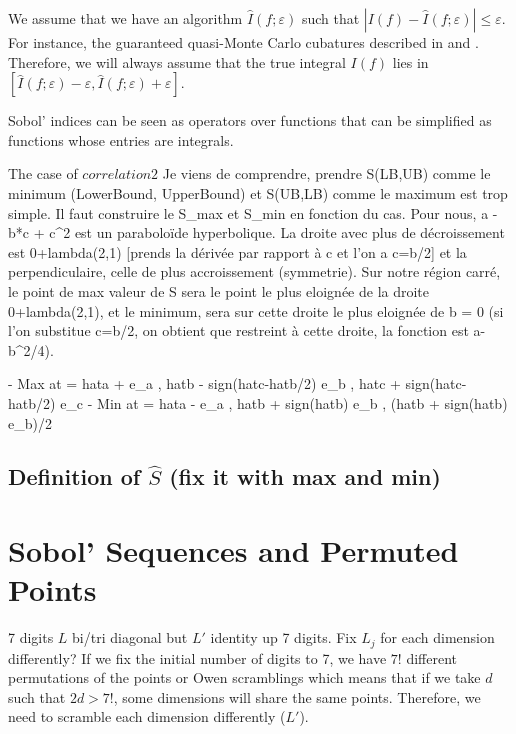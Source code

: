 \documentclass[]{elsarticle}
\theoremstyle{definition}
\def\abs#1{\ensuremath{\left \lvert #1 \right \rvert}}
\begin{document}
We assume that we have an algorithm $\widehat{I}(f;\varepsilon)$ such that $\abs{I(f)-\widehat{I}(f;\varepsilon)}\leq \varepsilon$. For instance, the guaranteed quasi-Monte Carlo cubatures described in \cite{-} and \cite{-}. Therefore, we will always assume that the true integral $I(f)$ lies in $[\widehat{I}(f;\varepsilon)-\varepsilon,\widehat{I}(f;\varepsilon)+\varepsilon]$.

Sobol' indices can be seen as operators over functions that can be simplified as functions whose entries are integrals.

The case of $correlation 2$
Je viens de comprendre, prendre S(LB,UB) comme le minimum (LowerBound, UpperBound) et S(UB,LB) comme le maximum est trop simple. Il faut construire le S_max et S_min en fonction du cas.
Pour nous, a - b*c + c^2 est un paraboloïde hyperbolique. La droite avec plus de décroissement est 0+lambda(2,1) [prends la dérivée par rapport à c et l'on a c=b/2] et la perpendiculaire, celle de plus accroissement (symmetrie). Sur notre région carré, le point de max valeur de S sera le point le plus eloignée de la droite 0+lambda(2,1), et le minimum, sera sur cette droite le plus eloignée de b = 0 (si l'on substitue c=b/2, on obtient que restreint à cette droite, la fonction est a-b^2/4).

- Max at = hat{a} + e_a  ,  hat{b} - sign(hat{c}-hat{b}/2) e_b  ,  hat{c} + sign(hat{c}-hat{b}/2) e_c
- Min at = hat{a} - e_a  ,  hat{b} + sign(hat{b}) e_b  ,  (hat{b} + sign(hat{b}) e_b)/2


\subsection{Definition of $\widehat{S}$ (fix it with max and min)}

\section{Sobol' Sequences and Permuted Points}
7 digits $L$ bi/tri diagonal but $L'$ identity up 7 digits.
Fix $L_j$ for each dimension differently?
If we fix the initial number of digits to 7, we have $7!$ different permutations of the points or Owen scramblings which means that if we take $d$ such that $2d>7!$, some dimensions will share the same points. Therefore, we need to scramble each dimension differently ($L'$).
\end{document}
